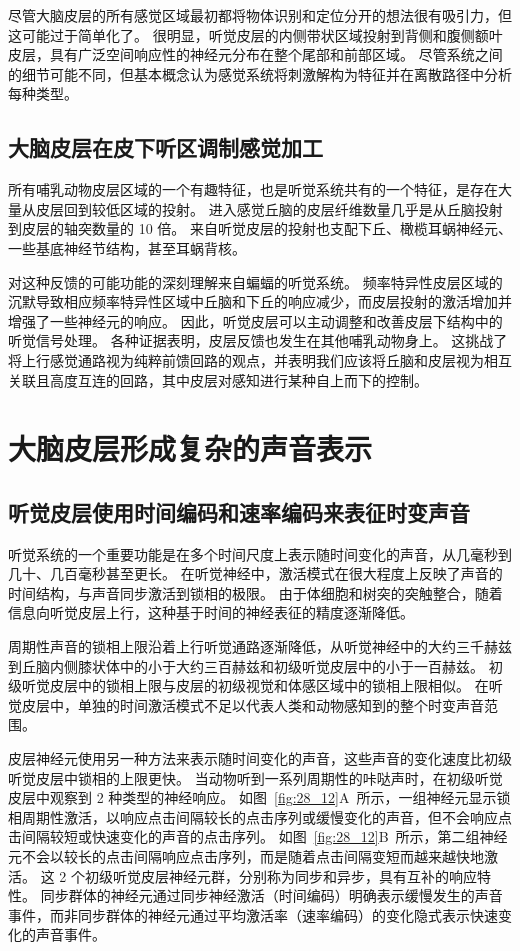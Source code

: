 尽管大脑皮层的所有感觉区域最初都将物体识别和定位分开的想法很有吸引力，但这可能过于简单化了。
很明显，听觉皮层的内侧带状区域投射到背侧和腹侧额叶皮层，具有广泛空间响应性的神经元分布在整个尾部和前部区域。
尽管系统之间的细节可能不同，但基本概念认为感觉系统将刺激解构为特征并在离散路径中分析每种类型。



\subsection{大脑皮层在皮下听区调制感觉加工}

所有哺乳动物皮层区域的一个有趣特征，也是听觉系统共有的一个特征，是存在大量从皮层回到较低区域的投射。
进入感觉丘脑的皮层纤维数量几乎是从丘脑投射到皮层的轴突数量的 10 倍。
来自听觉皮层的投射也支配下丘、橄榄耳蜗神经元、一些基底神经节结构，甚至耳蜗背核。


对这种反馈的可能功能的深刻理解来自蝙蝠的听觉系统。
频率特异性皮层区域的沉默导致相应频率特异性区域中丘脑和下丘的响应减少，而皮层投射的激活增加并增强了一些神经元的响应。
因此，听觉皮层可以主动调整和改善皮层下结构中的听觉信号处理。
各种证据表明，皮层反馈也发生在其他哺乳动物身上。
这挑战了将上行感觉通路视为纯粹前馈回路的观点，并表明我们应该将丘脑和皮层视为相互关联且高度互连的回路，其中皮层对感知进行某种自上而下的控制。



\section{大脑皮层形成复杂的声音表示}


\subsection{听觉皮层使用时间编码和速率编码来表征时变声音}

听觉系统的一个重要功能是在多个时间尺度上表示随时间变化的声音，从几毫秒到几十、几百毫秒甚至更长。
在听觉神经中，激活模式在很大程度上反映了声音的时间结构，与声音同步激活到锁相的极限。
由于体细胞和树突的突触整合，随着信息向听觉皮层上行，这种基于时间的神经表征的精度逐渐降低。


周期性声音的锁相上限沿着上行听觉通路逐渐降低，从听觉神经中的大约三千赫兹到丘脑内侧膝状体中的小于大约三百赫兹和初级听觉皮层中的小于一百赫兹。
初级听觉皮层中的锁相上限与皮层的初级视觉和体感区域中的锁相上限相似。
在听觉皮层中，单独的时间激活模式不足以代表人类和动物感知到的整个时变声音范围。


皮层神经元使用另一种方法来表示随时间变化的声音，这些声音的变化速度比初级听觉皮层中锁相的上限更快。
当动物听到一系列周期性的咔哒声时，在初级听觉皮层中观察到 2 种类型的神经响应。
如图~\ref{fig:28_12}A~所示，一组神经元显示锁相周期性激活，以响应点击间隔较长的点击序列或缓慢变化的声音，但不会响应点击间隔较短或快速变化的声音的点击序列。
如图~\ref{fig:28_12}B~所示，第二组神经元不会以较长的点击间隔响应点击序列，而是随着点击间隔变短而越来越快地激活。
这 2 个初级听觉皮层神经元群，分别称为同步和异步，具有互补的响应特性。
同步群体的神经元通过同步神经激活（时间编码）明确表示缓慢发生的声音事件，而非同步群体的神经元通过平均激活率（速率编码）的变化隐式表示快速变化的声音事件。


